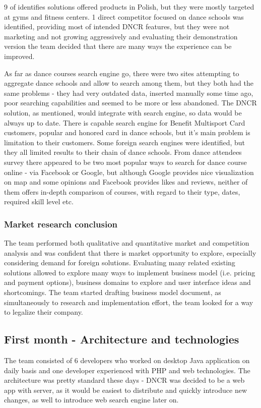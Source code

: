 \documentclass{article}
\begin{document}
9 of identifies solutions offered products in Polish, but they were mostly targeted at gyms and fitness centers. 1 direct competitor focused on dance schools was identified, providing most of intended DNCR features, but they were not marketing and not growing aggressively and evaluating their demonstration version the team decided that there are many ways the experience can be improved.

As far as dance courses search engine go, there were two sites attempting to aggregate dance schools and allow to search among them, but they both had the same problems - they had very outdated data, inserted manually some time ago, poor searching capabilities and seemed to be more or less abandoned. The DNCR solution, as mentioned, would integrate with search engine, so data would be always up to date. There is capable search engine for Benefit Multisport Card customers, popular and honored card in dance schools, but it's main problem is limitation to their customers. Some foreign search engines were identified, but they all limited results to their chain of dance schools. From dance attendees survey there appeared to be two most popular ways to search for dance course online - via Facebook or Google, but although Google provides nice visualization on map and some opinions and Facebook provides likes and reviews, neither of them offers in-depth comparison of courses, with regard to their type, dates, required skill level etc.

\subsubsection{Market research conclusion}
The team performed both qualitative and quantitative market and competition analysis and was confident that there is market opportunity to explore, especially considering demand for foreign solutions. Evaluating many related existing solutions allowed to explore many ways to implement business model (i.e. pricing and payment options), business domains to explore and user interface ideas and shortcomings. The team started drafting business model document, as simultaneously to research and implementation effort, the team looked for a way to legalize their company.

\subsection{First month - Architecture and technologies}
The team consisted of 6 developers who worked on desktop Java application on daily basis and one developer experienced with PHP and web technologies. The architecture was pretty standard these days - DNCR was decided to be a web app with server, as it would be easiest to distribute and quickly introduce new changes, as well to introduce web search engine later on.
\end{document}
